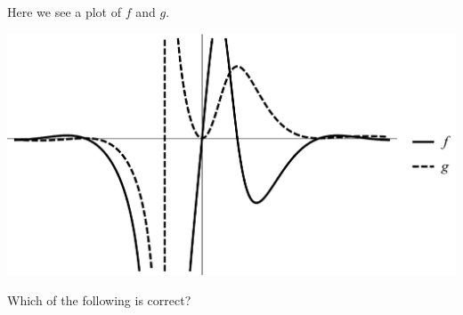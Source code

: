 \documentclass{ximera}
\author{Bart Snapp}
\begin{document}
\begin{exercise}

Here we see a plot of $f$ and $g$. 
\begin{image}
\includegraphics[width=.5\textwidth]{graphFandG10.png}
\end{image}
Which of the following is correct?
\begin{multipleChoice}
\end{multipleChoice}
\end{exercise}
\end{document}
